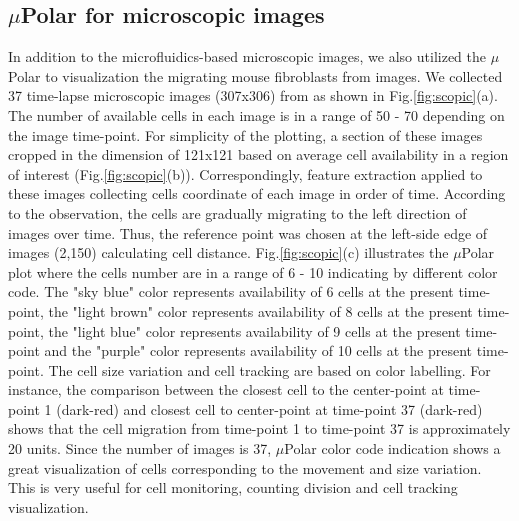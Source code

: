 \documentclass[conference]{IEEEtran}
\begin{document}
\subsection{$\mu$Polar for microscopic images}

In addition to the microfluidics-based microscopic images, we also utilized the $\mu$Polar to visualization the migrating mouse fibroblasts from images. We collected 37 time-lapse microscopic images (307x306) from \cite{ref05} as shown in Fig.\ref{fig:scopic}(a). The number of available cells in each image is in a range of 50 - 70 depending on the image time-point. For simplicity of the plotting, a section of these images cropped in the dimension of 121x121 based on average cell availability in a region of interest (Fig.\ref{fig:scopic}(b)). Correspondingly, feature extraction applied to these images collecting cells coordinate of each image in order of time. According to the observation, the cells are gradually migrating to the left direction of images over time. Thus, the reference point was chosen at the left-side edge of images (2,150) calculating cell distance. Fig.\ref{fig:scopic}(c) illustrates the $\mu$Polar plot where the cells number are in a range of 6 - 10 indicating by different color code. The "sky blue" color represents availability of 6 cells at the present time-point, the "light brown" color represents availability of 8 cells at the present time-point, the "light blue" color represents availability of 9 cells at the present time-point and the "purple" color represents availability of 10 cells at the present time-point. The cell size variation and cell tracking are based on color labelling. For instance, the comparison between the closest cell to the center-point at time-point 1 (dark-red) and closest cell to center-point at time-point 37 (dark-red) shows that the cell migration from time-point 1 to time-point 37 is approximately 20 units. Since the number of images is 37, $\mu$Polar color code indication shows a great visualization of cells corresponding to the movement and size variation. This is very useful for cell monitoring, counting division and cell tracking visualization.      
\end{document}
